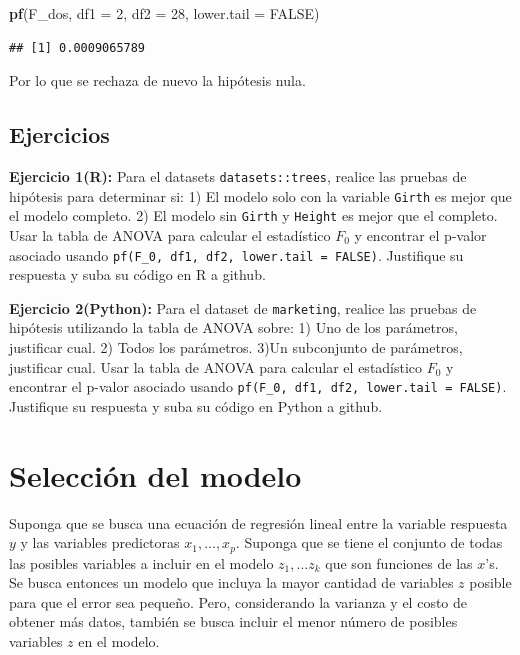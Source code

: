 \documentclass[
]{book}
\newenvironment{Shaded}{\begin{snugshade}}{\end{snugshade}}
\newcommand{\AttributeTok}[1]{\textcolor[rgb]{0.13,0.29,0.53}{#1}}
\newcommand{\ConstantTok}[1]{\textcolor[rgb]{0.56,0.35,0.01}{#1}}
\newcommand{\DecValTok}[1]{\textcolor[rgb]{0.00,0.00,0.81}{#1}}
\newcommand{\FunctionTok}[1]{\textcolor[rgb]{0.13,0.29,0.53}{\textbf{#1}}}
\newcommand{\NormalTok}[1]{#1}
\begin{document}
\begin{Shaded}
\begin{Highlighting}[]
\FunctionTok{pf}\NormalTok{(F\_dos, }\AttributeTok{df1 =} \DecValTok{2}\NormalTok{, }\AttributeTok{df2 =} \DecValTok{28}\NormalTok{, }\AttributeTok{lower.tail =} \ConstantTok{FALSE}\NormalTok{)}
\end{Highlighting}
\end{Shaded}

\begin{verbatim}
## [1] 0.0009065789
\end{verbatim}

Por lo que se rechaza de nuevo la hipótesis nula.

\subsection{Ejercicios}\label{ejercicios-3}

\textbf{Ejercicio 1(R):} Para el datasets \texttt{datasets::trees}, realice las pruebas de hipótesis para determinar si:
1) El modelo solo con la variable \texttt{Girth} es mejor que el modelo completo.
2) El modelo sin \texttt{Girth} y \texttt{Height} es mejor que el completo.
Usar la tabla de ANOVA para calcular el estadístico \(F_0\) y encontrar el p-valor asociado usando \texttt{pf(F\_0,\ df1,\ df2,\ lower.tail\ =\ FALSE)}. Justifique su respuesta y suba su código en R a github.

\textbf{Ejercicio 2(Python):} Para el dataset de \texttt{marketing}, realice las pruebas de hipótesis utilizando la tabla de ANOVA sobre:
1) Uno de los parámetros, justificar cual.
2) Todos los parámetros.
3)Un subconjunto de parámetros, justificar cual.
Usar la tabla de ANOVA para calcular el estadístico \(F_0\) y encontrar el p-valor asociado usando \texttt{pf(F\_0,\ df1,\ df2,\ lower.tail\ =\ FALSE)}. Justifique su respuesta y suba su código en Python a github.

\section{Selección del modelo}\label{selecciuxf3n-del-modelo}

Suponga que se busca una ecuación de regresión lineal entre la variable respuesta \(y\) y las variables predictoras \(x_1,...,x_p\). Suponga que se tiene el conjunto de todas las posibles variables a incluir en el modelo \(z_1,...z_k\) que son funciones de las \(x\)'s. Se busca entonces un modelo que incluya la mayor cantidad de variables \(z\) posible para que el error sea pequeño. Pero, considerando la varianza y el costo de obtener más datos, también se busca incluir el menor número de posibles variables \(z\) en el modelo.
\end{document}
